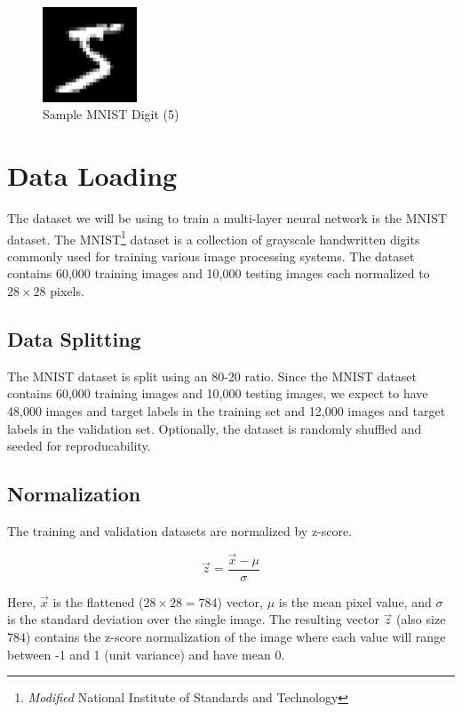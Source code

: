 \begin{figure}[H]
	\centering
	\includegraphics[width=0.25\textwidth]{./images/mnist_digit.png}
	\caption{Sample MNIST Digit (5)}
	\label{fig:example}
\end{figure}


\section{Data Loading}
The dataset we will be using to train a multi-layer neural network is the
MNIST dataset. The {MNIST}\footnote{\textit{Modified} National Institute of
	Standards and Technology} dataset is a collection of grayscale handwritten
digits commonly used for training various image processing systems. The dataset
contains 60,000 training images and 10,000 testing images each normalized to $28
	\times 28$ pixels.

\subsection{Data Splitting}
The MNIST dataset is split using an 80-20 ratio. Since the MNIST dataset
contains 60,000 training images and 10,000 testing images, we expect to have
48,000 images and target labels in the training set and 12,000 images and
target labels in the validation set. Optionally, the dataset is randomly
shuffled and seeded for reproducability.

\subsection{Normalization}
The training and validation datasets are normalized by z-score.

$$ \vec{z} = \frac{\vec{x} - \mu}{\sigma} $$

Here, $\vec{x}$ is the flattened ($ 28 \times 28 = 784$) vector, $\mu$ is
the mean pixel value, and $\sigma$ is the standard deviation over the single
image. The resulting vector $\vec{z}$ (also size $784$) contains the z-score
normalization of the image where each value will range between -1 and 1 (unit
variance) and have mean 0.

